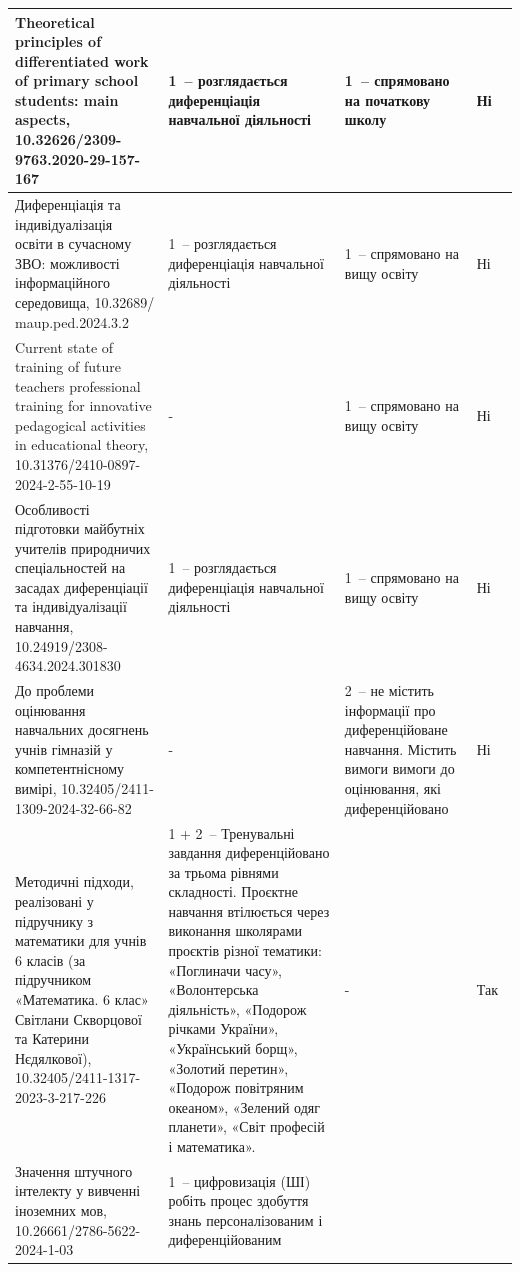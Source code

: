 {\begin{longtable}{|p{}|p{}|p{}|p{}|}
Theoretical principles of differentiated work of primary school students: main aspects, 10.32626/2309-9763.2020-29-157-167 & 
1~-- розглядається диференціація навчальної діяльності & 
1~-- спрямовано на початкову школу & 
Ні \\
\hline
{Диференціація та індивідуалізація освіти в сучасному ЗВО: можливості інформаційного середовища}, 10.32689/ maup.ped.2024.3.2 & 
1~-- розглядається диференціація навчальної діяльності & 
1~-- спрямовано на вищу освіту & 
Ні \\
\hline
{Current state of training of future teachers professional training for innovative pedagogical activities in educational theory}, 10.31376/2410-0897-2024-2-55-10-19 & 
- & 
1~-- спрямовано на вищу освіту  & 
Ні \\
\hline
{Особливості підготовки майбутніх учителів природничих спеціальностей на засадах диференціації та індивідуалізації навчання}, 10.24919/2308-4634.2024.301830 & 
1~-- розглядається диференціація навчальної діяльності & 
1~-- спрямовано на вищу освіту  & 
Ні \\
\hline
{До проблеми оцінювання навчальних досягнень учнів гімназій у компетентнісному вимірі},
10.32405/2411-1309-2024-32-66-82
& 
-
& 
2~-- не містить інформації про диференційоване навчання. Містить вимоги вимоги до оцінювання, які диференційовано
 & 
Ні
\\
\hline
 Методичні підходи, реалізовані у підручнику з математики для учнів 6 класів (за підручником «Математика. 6 клас» Світлани Скворцової та Катерини Нєдялкової),
10.32405/2411-1317-2023-3-217-226
 & 
1 + 2~-- Тренувальні завдання диференційовано за трьома рівнями складності. Проєктне навчання втілюється через виконання школярами проєктів різної тематики: «Поглиначи часу», «Волонтерська діяльність», «Подорож річками України», «Український борщ», «Золотий перетин», «Подорож повітряним океаном», «Зелений одяг планети», «Світ професій і математика».
 & 
-
 & 
Так~\cite{Скворцова_Нєдялкова_2023}
\\
\hline
{Значення штучного інтелекту у вивченні іноземних мов},
10.26661/2786-5622-2024-1-03
 & 
1~-- цифровизація (ШІ) робіть процес здобуття знань персоналізованим і диференційованим


\end{longtable}}
